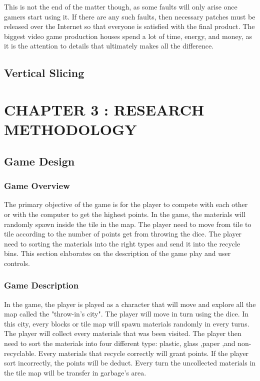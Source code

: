 \documentclass[12pt]{article}
\begin{document}
This is not the end of the matter though, as some faults will only arise once gamers start using it. If there are any such faults, then necessary patches must be released over the Internet so that everyone is satisfied with the final product. The biggest video game production houses spend a lot of time, energy, and money, as it is the attention to details that ultimately makes all the difference.

\subsection{Vertical Slicing}






\pagebreak


\section{CHAPTER 3 : RESEARCH METHODOLOGY}

\subsection{Game Design}

\subsubsection{Game Overview}
The primary objective of the game is for the player to compete with each other or with the computer to get the highest points. In the game, the materials will randomly spawn inside the tile in the map. The player need to move from tile to tile according to the number of points get from throwing the dice. The player need to sorting the materials into the right types and send it into the recycle bins. This section elaborates on the description of the game play and user controls.

\subsubsection{Game Description}
In the game, the player is played as a character that will move and explore all the map called the "throw-in's city". The player will move in turn using the dice. In this city, every blocks or tile map will spawn materials randomly in every turns. The player will collect every materials that was been visited. The player then need to sort the materials into four different type: plastic, glass ,paper ,and non-recyclable. Every materials that recycle correctly will grant points. If the player sort incorrectly, the points will be deduct. Every turn the uncollected materials in the tile map will be transfer in garbage's area. 
\end{document}
